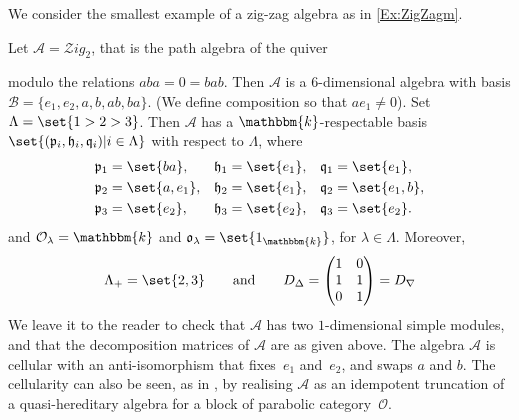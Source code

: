 \documentclass[a4paper,11pt]{amsart}
\newcommand\cB{\mathcal{B}}
\numberwithin{equation}{subsection}
\theoremstyle{definition}
\theoremstyle{theorem}
\theoremstyle{remark}
\newcommand\CA{\mathcal{A}}
\newcommand\CO{\mathcal{O}}
\newcommand\plam[1][\lambda]{\mathfrak{p}_{#1}}
\newcommand\hlam[1][\lambda]{\mathfrak{h}_{#1}}
\newcommand\qlam[1][\lambda]{\mathfrak{q}_{#1}}
\newcommand\Olam[1][\lambda]{\CO_{#1}}
\newcommand\olam[1][\lambda]{\mathfrak{o}_{#1}}
\newcommand\kk{\mathbbm{k}}
\begin{document}
We consider the smallest example of a zig-zag algebra as in \autoref{Ex:ZigZagm}.

  \begin{Example}\label{Ex:ZigZag}
    Let $\CA=\mathcal{Z}ig_2$, that is the path algebra of the quiver
    modulo the relations $aba=0=bab$. Then $\CA$ is a $6$-dimensional
    algebra with basis $\cB=\{e_1,e_2,a,b,ab,ba\}$. (We define composition
    so that $ae_1\not=0$). Set  $\Lambda=\set{1>2>3}$. Then $\CA$ has a
    $\kk$-respectable basis $\set{(\plam[i],\hlam[i],\qlam[i])|i\in\Lambda}$
    with respect to $\Lambda$, where
    \begin{align*}
      \plam[1] &= \set{ba},      & \hlam[1] &= \set{e_1}, & \qlam[1] &= \set{e_1}, \\
      \plam[2] &= \set{a, e_1},  & \hlam[2] &= \set{e_1}, & \qlam[2] &= \set{e_1, b}, \\
      \plam[3] &= \set{e_2},     & \hlam[3] &= \set{e_2}, & \qlam[3] &= \set{e_2}.
    \end{align*}
    and $\Olam=\kk$ and $\olam=\set{1_\kk}$, for $\lambda\in\Lambda$.
    Moreover,
    \[
              \Lambda_+ = \set{2,3}\qquad\text{and}\qquad
              D_\Delta =
              \begin{pmatrix}
                  1 & 0 \\
                  1 & 1 \\
                  0 & 1
              \end{pmatrix}=D_\nabla
    \]
  We leave it to the reader to check that  $\CA$ has two
  $1$-dimensional simple modules, and that the decomposition matrices of
  $\CA$ are as given above. The algebra $\CA$ is
  cellular with an anti-isomorphism that fixes~$e_1$ and~$e_2$,
  and swaps $a$ and $b$. The cellularity can also be seen, as in \cite{BrundanStroppel:KhovanovIII},  by realising $\CA$ as
  an idempotent truncation of a quasi-hereditary algebra for a
  block of parabolic category~$\CO$.
\end{Example}
\end{document}
